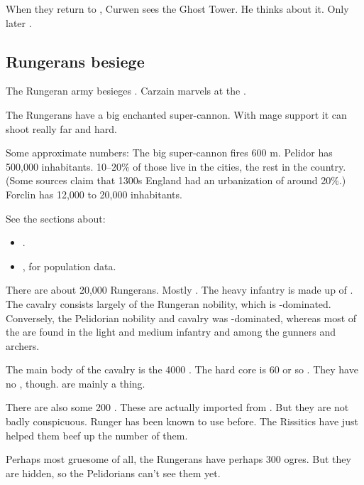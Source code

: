 When they return to \Forclin, Curwen sees the Ghost Tower. 
He thinks about it.
Only later . 









\subsection{Rungerans besiege \Forclin}
The Rungeran army besieges \Forclin. 
Carzain marvels at the . 

The Rungerans have a big enchanted super-cannon. 
With mage support it can shoot really far and hard. 

Some approximate numbers:
The big super-cannon fires 600 m. 
Pelidor has 500,000 inhabitants. 
10--20\% of those live in the cities, the rest in the country.
(Some sources claim that 1300s England had an urbanization of around 20\%.)
Forclin has 12,000 to 20,000 inhabitants. 

See the sections about:
\begin{itemize}
  \item {}. 
  \item {}, for population data. 
\end{itemize}

There are about 20,000 Rungerans. 
Mostly \humans. 
The heavy infantry is made up of \scathae. 
The cavalry consists largely of the Rungeran nobility, which is \human-dominated. 
Conversely, the Pelidorian nobility and cavalry was \scatha-dominated, whereas most of the \humans are found in the light and medium infantry and among the gunners and archers. 

The main body of the cavalry is the 4000 \relcers. 
The hard core is 60 or so \murocs. 
They have no \grulcans, though. 
\Grulcans are mainly a \Galessan thing.

There are also some 200 \mezolisks. 
These are actually imported from \Durcac. 
But they are not badly conspicuous. 
Runger has been known to use \mezolisks{} before. 
The Rissitics have just helped them beef up the number of them. 

Perhaps most gruesome of all, the Rungerans have perhaps 300 \nephil ogres. 
But they are hidden, so the Pelidorians can't see them yet. 

